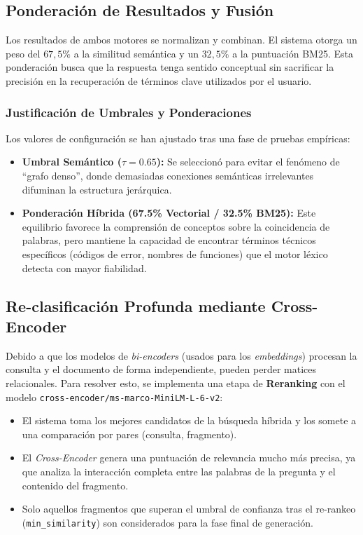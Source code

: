 \subsection{Ponderación de Resultados y Fusión}
Los resultados de ambos motores se normalizan y combinan. El sistema otorga un peso del $67,5\%$ a la similitud semántica y un $32,5\%$ a la puntuación BM25. Esta ponderación busca que la respuesta tenga sentido conceptual sin sacrificar la precisión en la recuperación de términos clave utilizados por el usuario.

\subsubsection{Justificación de Umbrales y Ponderaciones}
Los valores de configuración se han ajustado tras una fase de pruebas empíricas:
\begin{itemize}
    \item \textbf{Umbral Semántico ($\tau = 0.65$):} Se seleccionó para evitar el fenómeno de ``grafo denso'', donde demasiadas conexiones semánticas irrelevantes difuminan la estructura jerárquica.
    \item \textbf{Ponderación Híbrida (67.5\% Vectorial / 32.5\% BM25):} Este equilibrio favorece la comprensión de conceptos sobre la coincidencia de palabras, pero mantiene la capacidad de encontrar términos técnicos específicos (códigos de error, nombres de funciones) que el motor léxico detecta con mayor fiabilidad.
\end{itemize}

\subsection{Re-clasificación Profunda mediante Cross-Encoder}
Debido a que los modelos de \textit{bi-encoders} (usados para los \textit{embeddings}) procesan la consulta y el documento de forma independiente, pueden perder matices relacionales. Para resolver esto, se implementa una etapa de \textbf{Reranking} con el modelo \nolinkurl{cross-encoder/ms-marco-MiniLM-L-6-v2}:
\begin{itemize}
    \item El sistema toma los mejores candidatos de la búsqueda híbrida y los somete a una comparación por pares (consulta, fragmento).
    \item El \textit{Cross-Encoder} genera una puntuación de relevancia mucho más precisa, ya que analiza la interacción completa entre las palabras de la pregunta y el contenido del fragmento.
    \item Solo aquellos fragmentos que superan el umbral de confianza tras el re-rankeo (\texttt{min\_similarity}) son considerados para la fase final de generación.
\end{itemize}

